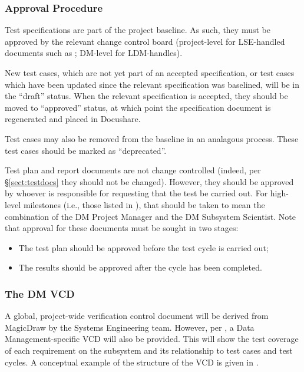 \subsubsection{Approval Procedure}

Test specifications are part of the project baseline.
As such, they must be approved by the relevant change control board (project-level for LSE-handled documents such as ; DM-level for LDM-handles).

New test cases, which are not yet part of an accepted specification, or test cases which have been updated since the relevant specification was baselined, will be in the ``draft'' status.
When the relevant specification is accepted, they should be moved to ``approved'' status, at which point the specification document is regenerated and placed in Docushare.

Test cases may also be removed from the baseline in an analagous process.
These test cases should be marked as ``deprecated''.

Test plan and report documents are not change controlled (indeed, per \S\ref{sect:testdocs} they should not be changed).
However, they should be approved by whoever is responsible for requesting that the test be carried out.
For high-level milestones (i.e., those listed in ), that should be taken to mean the combination of the DM Project Manager and the DM Subsystem Scientist.
Note that approval for these documents must be sought in two stages:

\begin{itemize}

  \item{The test plan should be approved before the test cycle is carried out;}
  \item{The results should be approved after the cycle has been completed.}

\end{itemize}

\subsubsection{The DM VCD}

A global, project-wide verification control document will be derived from MagicDraw by the Systems Engineering team.
However, per , a Data Management-specific VCD will also be provided.
This will show the test coverage of each requirement on the subsystem and its relationship to test cases and test cycles.
A conceptual example of the structure of the VCD is given in .

